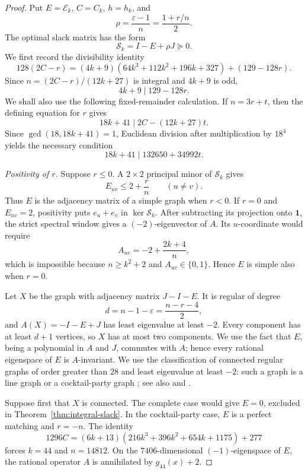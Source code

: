\documentclass[a4paper,10pt,reqno]{amsart}
\theoremstyle{plain}
\theoremstyle{definition}
\theoremstyle{remark}
\newcommand{\one}{\mathbf 1}
\begin{document}
\begin{proof}
Put \(E=\mathcal E_k\), \(C=C_k\), \(h=h_k\), and
\[
 \rho=\frac{\varepsilon-1}{n}
      =\frac{1+r/n}{2}.
\]
The optimal slack matrix has the form
\[
 \mathcal S_k=I-E+\rho J\succeq0.
\]
 We first record the divisibility identity
\[
 128(2C-r)
 =(4k+9)(64k^3+112k^2+196k+327)+(129-128r).
\]
Since \(n=(2C-r)/(12k+27)\) is integral and \(4k+9\) is odd,
\begin{equation}\label{eq:r-divisibility}
 4k+9\mid129-128r.
\end{equation}
We shall also use the following fixed-remainder calculation.  If
\(n=3r+t\), then the defining equation for \(r\) gives
\[
 18k+41\mid 2C-(12k+27)t.
\]
Since \(\gcd(18,18k+41)=1\), Euclidean division after multiplication by
\(18^4\) yields the necessary condition
\begin{equation}\label{eq:fixed-remainder}
 18k+41\mid 132650+34992t.
\end{equation}

\smallskip
\noindent\emph{Positivity of \(r\).}
Suppose \(r\le0\).  A \(2\times2\) principal minor of \(\mathcal S_k\)
gives
\[
 E_{uv}\le2+\frac rn\qquad(u\ne v).
\]
Thus \(E\) is the adjacency matrix of a simple graph when \(r<0\).  If
\(r=0\) and \(E_{uv}=2\), positivity puts \(e_u+e_v\) in
\(\ker\mathcal S_k\).  After subtracting its projection onto \(\one\), the
strict spectral window gives a \((-2)\)-eigenvector of \(A\).  Its
\(u\)-coordinate would require
\[
 A_{uv}=-2+\frac{2k+4}{n},
\]
which is impossible because \(n\ge k^2+2\) and \(A_{uv}\in\{0,1\}\).
Hence \(E\) is simple also when \(r=0\).

Let \(X\) be the graph with adjacency matrix \(J-I-E\).  It is regular of degree
\[
 d=n-1-\varepsilon=\frac{n-r-4}{2},
\]
and \(A(X)=-I-E+J\) has least eigenvalue at least \(-2\).  Every component
has at least \(d+1\) vertices, so \(X\) has at most two components.  We use
the fact that \(E\), being a polynomial in \(A\) and \(J\), commutes with
\(A\); hence every rational eigenspace of \(E\) is \(A\)-invariant.  We use
 the classification of connected regular graphs of order greater than \(28\)
 and least eigenvalue at least \(-2\): such a graph is a line graph or a
 cocktail-party graph \cite{CameronEtAl1976}; see also
 \cite[Theorems~4.1.1 and~4.1.5]{CvetkovicEtAl2004} and
 \cite[Introduction]{KoolenEtAl2025}.

Suppose first that \(X\) is connected.  The complete case would give
\(E=0\), excluded in Theorem~\ref{thm:integral-slack}.  In the
cocktail-party case, \(E\) is a perfect matching and \(r=-n\).  The identity
\[
 1296C=(6k+13)(216k^3+396k^2+654k+1175)+277
\]
forces \(k=44\) and \(n=14812\).  On the \(7406\)-dimensional
 \((-1)\)-eigenspace of \(E\), the rational operator \(A\) is annihilated by
 \(g_{44}(x)+2\).


\end{proof}
\end{document}
